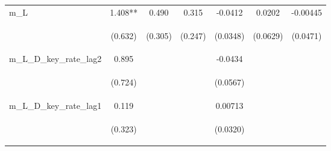 \documentclass[]{article}
\begin{document}
\begin{center}
\begin{tabular}{lcccccc}
m\_L & 1.408** & 0.490 & 0.315 & -0.0412 & 0.0202 & -0.00445 \\
\vspace{4pt} & \begin{footnotesize}(0.632)\end{footnotesize} & \begin{footnotesize}(0.305)\end{footnotesize} & \begin{footnotesize}(0.247)\end{footnotesize} & \begin{footnotesize}(0.0348)\end{footnotesize} & \begin{footnotesize}(0.0629)\end{footnotesize} & \begin{footnotesize}(0.0471)\end{footnotesize} \\
m\_L\_D\_key\_rate\_lag2 & 0.895 &  &  & -0.0434 &  &  \\
\vspace{4pt} & \begin{footnotesize}(0.724)\end{footnotesize} & \begin{footnotesize}\end{footnotesize} & \begin{footnotesize}\end{footnotesize} & \begin{footnotesize}(0.0567)\end{footnotesize} & \begin{footnotesize}\end{footnotesize} & \begin{footnotesize}\end{footnotesize} \\
m\_L\_D\_key\_rate\_lag1 & 0.119 &  &  & 0.00713 &  &  \\
\vspace{4pt} & \begin{footnotesize}(0.323)\end{footnotesize} & \begin{footnotesize}\end{footnotesize} & \begin{footnotesize}\end{footnotesize} & \begin{footnotesize}(0.0320)\end{footnotesize} & \begin{footnotesize}\end{footnotesize} & \begin{footnotesize}\end{footnotesize} \\

\end{tabular}
\end{center}
\end{document}
